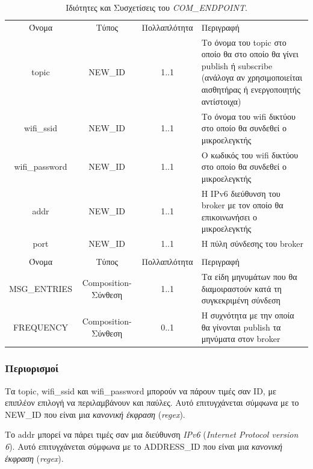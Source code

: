 \begin{table}[H]
	\begin{center}
		\begin{tabular}{ | c | c | c| m{5.5cm} | }
			\hline
			\rowcolor{Gray}
			\multicolumn{4}{|c|}{\textbf{Ιδιότητες}}\\
			\hline
			\rowcolor{Gray}
			Όνομα & Τύπος & Πολλαπλότητα & Περιγραφή \\
			\hline
			topic & NEW\_ID & 1..1 & Το όνομα του topic στο οποίο θα στο οποίο θα γίνει publish ή subscribe (ανάλογα αν χρησιμοποιείται αισθητήρας ή ενεργοποιητής αντίστοιχα) \\
			\hline
			wifi\_ssid & NEW\_ID & 1..1 & Το όνομα του wifi δικτύου στο οποίο θα συνδεθεί ο μικροελεγκτής \\
			\hline
			wifi\_password & NEW\_ID & 1..1 & Ο κωδικός του wifi δικτύου στο οποίο θα συνδεθεί ο μικροελεγκτής \\
			\hline
			addr & NEW\_ID & 1..1 & Η IPv6 διεύθυνση του broker με τον οποίο θα επικοινωνήσει ο μικροελεγκτής \\
			\hline
			port & NEW\_ID & 1..1 & Η πύλη σύνδεσης του broker \\
			\hline
			\rowcolor{Gray}
			\multicolumn{4}{|c|}{\textbf{Συσχετίσεις}}\\
			\hline
			\rowcolor{Gray}
			Όνομα & Τύπος & Πολλαπλότητα & Περιγραφή \\
			\hline
			MSG\_ENTRIES & Composition-Σύνθεση & 1..1 &  Τα είδη μηνυμάτων που θα διαμοιραστούν κατά τη συγκεκριμένη σύνδεση \\
			\hline
			FREQUENCY & Composition-Σύνθεση & 0..1 &  Η συχνότητα με την οποία θα γίνονται publish τα μηνύματα στον broker \\
			\hline
		\end{tabular}
		\caption{Ιδιότητες και Συσχετίσεις του \textit{COM\_ENDPOINT}.}
		\label{tab:com_endpoint}
	\end{center}
\end{table}

\subsubsection*{Περιορισμοί}

\noindent Τα topic, wifi\_ssid και wifi\_password μπορούν να πάρουν τιμές σαν ID, με επιπλέον επιλογή να περιλαμβάνουν και παύλες. Αυτό επιτυγχάνεται σύμφωνα με το NEW\_ID που είναι μια \textit{κανονική έκφραση} (\textit{regex}).

\noindent Το addr μπορεί να πάρει τιμές σαν μια διεύθυνση \textit{IPv6} (\textit{Internet Protocol version 6}). Αυτό επιτυγχάνεται σύμφωνα με το ADDRESS\_ID που είναι μια \textit{κανονική έκφραση} (\textit{regex}).

